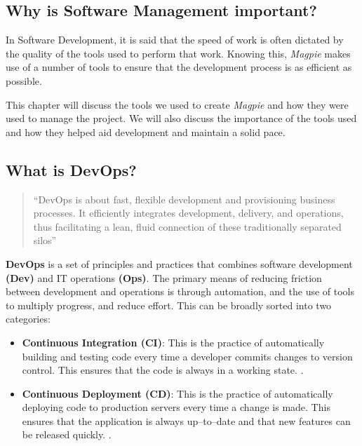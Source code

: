\subsection{Why is Software Management important?}
\label{sec:software_management}
In Software Development, it is said that the speed of work is often dictated by
the quality of the tools used to perform that work. Knowing this,
\textit{Magpie} makes use of a number of tools to ensure that the development
process is as efficient as possible.

This chapter will discuss the tools we used to create \textit{Magpie} and how
they were used to manage the project. We will also discuss the importance of the
tools used and how they helped aid development and maintain a solid pace.

\subsection{What is DevOps?}
\label{sec:devops}

\begin{quote}
    ``DevOps is about fast, flexible development and provisioning business
    processes. It efficiently integrates development, delivery, and operations,
    thus facilitating a lean, fluid connection of these traditionally separated
    silos''
    \cite{DevOps}
\end{quote}

\textbf{DevOps} is a set of principles and practices that combines software
development \textbf{(Dev)} and IT operations \textbf{(Ops)}. The primary means
of reducing friction between development and operations is through automation,
and the use of tools to multiply progress, and reduce effort. This can be
broadly sorted into two categories:

\begin{itemize}
    \item{\textbf{Continuous Integration (CI)}: This is the practice of
        automatically building and testing code every time a developer commits
        changes to version control. This ensures that the code is always in a
        working state. \cite{DevOps}.}
        \vspace{1em}
    \item{\textbf{Continuous Deployment (CD)}: This is the practice of
        automatically deploying code to production servers every time a change
        is made. This ensures that the application is always up–to–date and that
        new features can be released quickly. \cite{DevOps}.}
\end{itemize}

